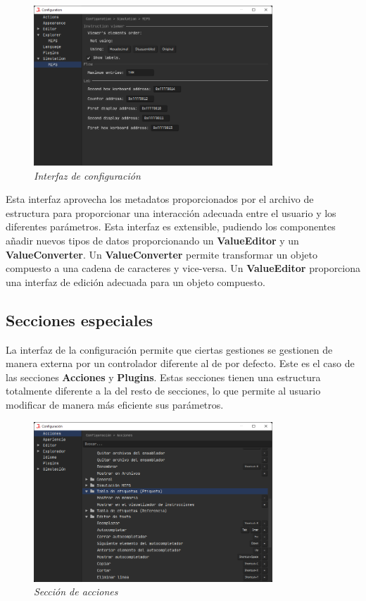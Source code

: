 \begin{figure}[H]
    \centering
    \includegraphics[width=0.8\textwidth]{images/base/jams-config}
    \caption{\textit{Interfaz de configuración}}
    \label{fig:jams-configuracion}
\end{figure}

\noindent Esta interfaz aprovecha los metadatos proporcionados por el archivo
de estructura para proporcionar una interacción adecuada entre el usuario
y los diferentes parámetros.
Esta interfaz es extensible, pudiendo los componentes añadir nuevos tipos de datos
proporcionando un \textbf{ValueEditor} y un \textbf{ValueConverter}.
Un \textbf{ValueConverter} permite transformar un objeto compuesto a una cadena
de caracteres y vice-versa.
Un \textbf{ValueEditor} proporciona una interfaz de edición adecuada para un
objeto compuesto.

\subsection{Secciones especiales}\label{subsec:secciones-especiales}

La interfaz de la configuración permite que ciertas gestiones se
gestionen de manera externa por un controlador diferente al de
por defecto.
Este es el caso de las secciones \textbf{Acciones} y \textbf{Plugins}.
Estas secciones tienen una estructura totalmente diferente a la
del resto de secciones, lo que permite al usuario modificar
de manera más eficiente sus parámetros.

\begin{figure}[H]
    \centering
    \includegraphics[width=0.8\textwidth]{images/base/jams-config-actions}
    \caption{\textit{Sección de acciones}}
    \label{fig:jams-configuracion-acciones}
\end{figure}


